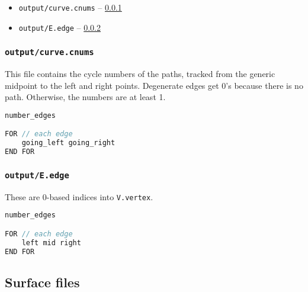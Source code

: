 \begin{itemize}
	\item {\tt output/curve.cnums} -- \ref{sec:curve.cnums}
	\item {\tt output/E.edge} -- \ref{sec:e.edge}
\end{itemize}


\subsubsection{\tt output/curve.cnums}
\label{sec:curve.cnums}


This file contains the cycle numbers of the paths, tracked from the generic midpoint to the left and right points.  Degenerate edges get 0's because there is no path.  Otherwise, the numbers are at least 1.

\begin{center}\begin{minipage}{0.9\linewidth}
\begin{lstlisting}[language=c++, caption={\tt output/curve.cnums}, captionpos=b]
number_edges

FOR // each edge
	going_left going_right
END FOR
\end{lstlisting}
\end{minipage}\end{center}



\subsubsection{\tt output/E.edge}
\label{sec:e.edge}

These are 0-based indices into {\tt V.vertex}.

\begin{center}\begin{minipage}{0.9\linewidth}
\begin{lstlisting}[language=c++, caption={\tt output/E.edge}, captionpos=b]
number_edges

FOR // each edge
	left mid right
END FOR
\end{lstlisting}
\end{minipage}\end{center}









\clearpage
\subsection{Surface files}
\label{sec:surface_files}


